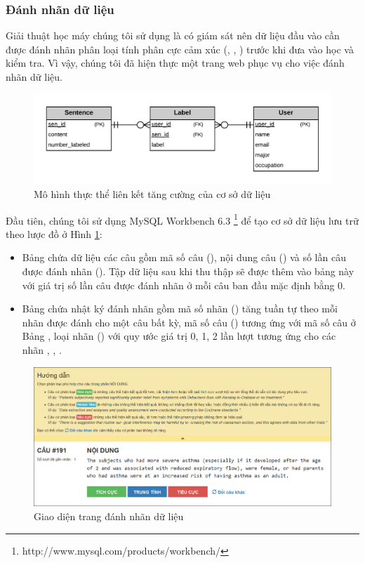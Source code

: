 \subsubsection*{Đánh nhãn dữ liệu}
Giải thuật học máy chúng tôi sử dụng là có giám sát nên dữ liệu đầu vào cần được đánh nhãn phân loại tính phân cực cảm xúc (\tichcuc, \tieucuc, \trungtinh) trước khi đưa vào học và kiểm tra. Vì vậy, chúng tôi đã hiện thực một trang web phục vụ cho việc đánh nhãn dữ liệu.\\

\begin{figure}[h]
\centering
\includegraphics[scale=0.25]{../hinh/EERD.png}
\caption{Mô hình thực thể liên kết tăng cường của cơ sở dữ liệu}
\label{fig:SQL}
\end{figure}

Đầu tiên, chúng tôi sử dụng MySQL Workbench 6.3 \footnote{http://www.mysql.com/products/workbench/} để tạo cơ sở dữ liệu lưu trữ theo lược đồ ở Hình \ref{fig:SQL}:
\begin{itemize}
\item Bảng  chứa dữ liệu các câu gồm mã số câu (), nội dung câu () và số lần câu được đánh nhãn (). Tập dữ liệu sau khi thu thập sẽ được thêm vào bảng này với giá trị số lần câu được đánh nhãn ở mỗi câu ban đầu mặc định bằng 0.
\item Bảng  chứa nhật ký đánh nhãn gồm mã số nhãn () tăng tuần tự theo mỗi nhãn được đánh cho một câu bất kỳ, mã số câu () tương ứng với mã số câu ở Bảng , loại nhãn () với quy ước giá trị 0, 1, 2 lần lượt tương ứng cho các nhãn \tieucuc, \trungtinh, \tichcuc.
\end{itemize}

\begin{figure}[H]
\centering
\includegraphics[scale=0.45]{../hinh/Webpage.png}
\caption{Giao diện trang đánh nhãn dữ liệu}
\label{fig:web}
\end{figure}

